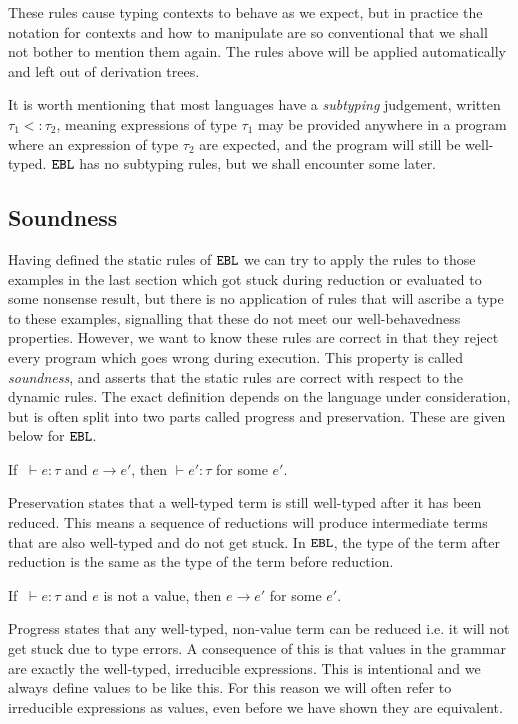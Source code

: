 These rules cause typing contexts to behave as we expect, but in practice the notation for contexts and how to manipulate are so conventional that we shall not bother to mention them again. The rules above will be applied automatically and left out of derivation trees.

It is worth mentioning that most languages have a \textit{subtyping} judgement, written $\tau_1 <: \tau_2$, meaning expressions of type $\tau_1$ may be provided anywhere in a program where an expression of type $\tau_2$ are expected, and the program will still be well-typed. $\mathtt{EBL}$ has no subtyping rules, but we shall encounter some later.

\subsection{Soundness}

Having defined the static rules of $\mathtt{EBL}$ we can try to apply the rules to those examples in the last section which got stuck during reduction or evaluated to some nonsense result, but there is no application of rules that will ascribe a type to these examples, signalling that these do not meet our well-behavedness properties. However, we want to know these rules are correct in that they reject every program which goes wrong during execution. This property is called \textit{soundness}, and asserts that the static rules are correct with respect to the dynamic rules. The exact definition depends on the language under consideration, but is often split into two parts called progress and preservation. These are given below for $\mathtt{EBL}$.

\begin{theorem}
If $~\vdash e: \tau$ and $e \longrightarrow e'$, then $\vdash e': \tau$ for some $e'$.
\end{theorem}

Preservation states that a well-typed term is still well-typed after it has been reduced. This means a sequence of reductions will produce intermediate terms that are also well-typed and do not get stuck. In $\mathtt{EBL}$, the type of the term after reduction is the same as the type of the term before reduction.

\begin{theorem}
If $~\vdash e: \tau$ and $e$ is not a value, then $e \longrightarrow e'$ for some $e'$.
\end{theorem}

Progress states that any well-typed, non-value term can be reduced i.e. it will not get stuck due to type errors. A consequence of this is that values in the grammar are exactly the well-typed, irreducible expressions. This is intentional and we always define values to be like this. For this reason we will often refer to irreducible expressions as values, even before we have shown they are equivalent.

